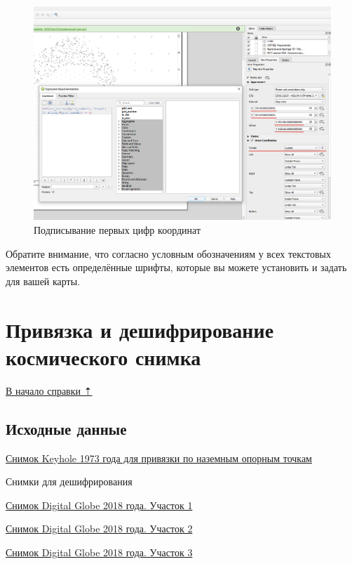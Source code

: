 \documentclass[
  12pt,
]{book}
\begin{document}
\begin{figure}
\centering
\includegraphics{images/Practice/Expression_label_First.png}
\caption{Подписывание первых цифр координат}
\end{figure}

Обратите внимание, что согласно условным обозначениям у всех текстовых элементов есть определённые шрифты, которые вы можете установить и задать для вашей карты.

\section{Привязка и дешифрирование космического снимка}\label{practice-georeference}

\hyperref[practice]{В начало справки ⇡}

\subsection{Исходные данные}\label{practice-georeference-data}

\href{https://disk.yandex.ru/i/7a93zQEgNnI4dA}{Снимок Keyhole 1973 года для привязки по наземным опорным точкам}

Снимки для дешифрирования

\href{https://disk.yandex.ru/i/bIn38XOCT92FXA}{Снимок Digital Globe 2018 года. Участок 1}

\href{https://disk.yandex.ru/i/_VykXwJloU-0yA}{Снимок Digital Globe 2018 года. Участок 2}

\href{https://disk.yandex.ru/i/D0-eTUvb3eX_1w}{Снимок Digital Globe 2018 года. Участок 3}
\end{document}
